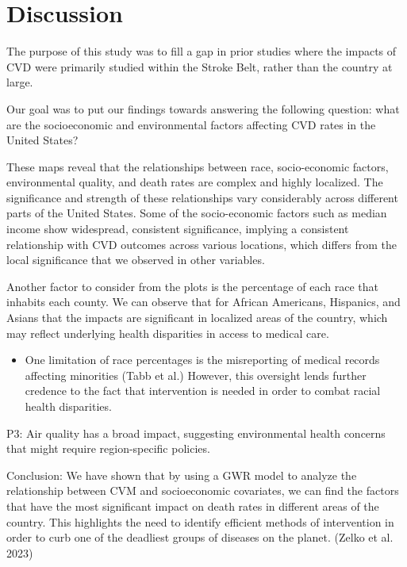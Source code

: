 \documentclass[
]{article}
\providecommand{\tightlist}{%
  \setlength{\itemsep}{0pt}\setlength{\parskip}{0pt}}\usepackage{longtable,booktabs,array}
\begin{document}
\section{Discussion}\label{discussion}

The purpose of this study was to fill a gap in prior studies where the
impacts of CVD were primarily studied within the Stroke Belt, rather
than the country at large.

Our goal was to put our findings towards answering the following
question: what are the socioeconomic and environmental factors affecting
CVD rates in the United States?

These maps reveal that the relationships between race, socio-economic
factors, environmental quality, and death rates are complex and highly
localized. The significance and strength of these relationships vary
considerably across different parts of the United States. Some of the
socio-economic factors such as median income show widespread, consistent
significance, implying a consistent relationship with CVD outcomes
across various locations, which differs from the local significance that
we observed in other variables.

Another factor to consider from the plots is the percentage of each race
that inhabits each county. We can observe that for African Americans,
Hispanics, and Asians that the impacts are significant in localized
areas of the country, which may reflect underlying health disparities in
access to medical care.

\begin{itemize}
\tightlist
\item
  One limitation of race percentages is the misreporting of medical
  records affecting minorities (Tabb et al.) However, this oversight
  lends further credence to the fact that intervention is needed in
  order to combat racial health disparities.
\end{itemize}

P3: Air quality has a broad impact, suggesting environmental health
concerns that might require region-specific policies.~

Conclusion: We have shown that by using a GWR model to analyze the
relationship between CVM and socioeconomic covariates, we can find the
factors that have the most significant impact on death rates in
different areas of the country. This highlights the need to identify
efficient methods of intervention in order to curb one of the deadliest
groups of diseases on the planet. (Zelko et al. 2023)
\end{document}
